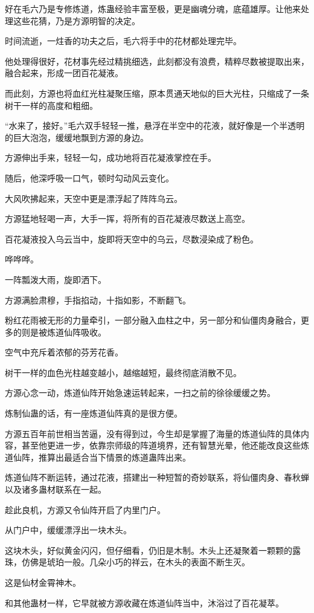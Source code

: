 \begin{this_body}
好在毛六乃是专修炼道，炼蛊经验丰富至极，更是幽魂分魂，底蕴雄厚。让他来处理这些花猜，乃是方源明智的决定。

时间流逝，一炷香的功夫之后，毛六将手中的花材都处理完毕。

他处理得很好，花材事先经过精挑细选，此刻都没有浪费，精粹尽数被提取出来，融合起来，形成一团百花凝液。

而此刻，方源也将血红光柱凝聚压缩，原本贯通天地似的巨大光柱，只缩成了一条树干一样的高度和粗细。

“水来了，接好。”毛六双手轻轻一推，悬浮在半空中的花液，就好像是一个半透明的巨大泡泡，缓缓地飘到方源的身边。

方源伸出手来，轻轻一勾，成功地将百花凝液掌控在手。

随后，他深呼吸一口气，顿时勾动风云变化。

大风吹拂起来，天空中更是漂浮起了阵阵乌云。

方源猛地轻喝一声，大手一挥，将所有的百花凝液尽数送上高空。

百花凝液投入乌云当中，旋即将天空中的乌云，尽数浸染成了粉色。

哗哗哗。

一阵瓢泼大雨，旋即洒下。

方源满脸肃穆，手指掐动，十指如影，不断翻飞。

粉红花雨被无形的力量牵引，一部分融入血柱之中，另一部分和仙僵肉身融合，更多的则是被炼道仙阵吸收。

空气中充斥着浓郁的芬芳花香。

树干一样的血色光柱越变越小，越缩越短，最终彻底消散不见。

方源心念一动，炼道仙阵开始急速运转起来，一扫之前的徐徐缓缓之势。

炼制仙蛊的话，有一座炼道仙阵真的是很方便。

方源五百年前世相当苦逼，没有得到过，今生却是掌握了海量的炼道仙阵的具体内容，甚至他更进一步，依靠宗师级的阵道境界，还有智慧光晕，他还能改良这些炼道仙阵，推算出最适合当下情景的炼道蛊阵出来。

炼道仙阵不断运转，通过花液，搭建出一种短暂的奇妙联系，将仙僵肉身、春秋蝉以及诸多蛊材联系在一起。

趁此良机，方源又令仙阵开启了内里门户。

从门户中，缓缓漂浮出一块木头。

这块木头，好似黄金闪闪，但仔细看，仍旧是木制。木头上还凝聚着一颗颗的露珠，仿佛是琥珀一般。几朵小巧的祥云，在木头的表面不断生灭。

这是仙材金霄神木。

和其他蛊材一样，它早就被方源收藏在炼道仙阵当中，沐浴过了百花凝萃。


\end{this_body}
